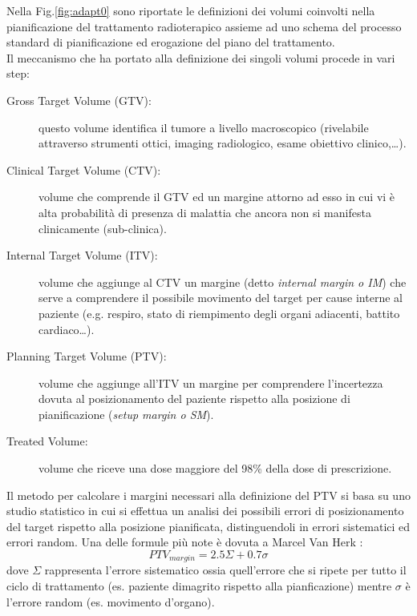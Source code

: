Nella Fig.\ref{fig:adapt0} sono riportate le definizioni dei volumi coinvolti nella pianificazione del trattamento radioterapico assieme ad uno schema del processo standard di pianificazione ed erogazione del piano del trattamento.\\
Il meccanismo che ha portato alla definizione dei singoli volumi procede in vari step:
\begin{description}
\item[Gross Target Volume (GTV):] questo volume identifica il tumore a livello macroscopico (rivelabile attraverso strumenti ottici, imaging radiologico, esame obiettivo clinico,\ldots).

\item[Clinical Target Volume (CTV):] volume che comprende il GTV ed un margine attorno ad esso in cui vi è alta probabilità di presenza di malattia che ancora non si manifesta clinicamente (sub-clinica).

\item[Internal Target Volume (ITV):] volume che aggiunge al CTV un margine (detto \textit{internal margin o IM}) che serve a comprendere il possibile movimento del target per cause interne al paziente (e.g. respiro, stato di riempimento degli organi adiacenti, battito cardiaco\ldots).

\item[Planning Target Volume (PTV):] volume che aggiunge all'ITV un margine per comprendere l'incertezza dovuta al posizionamento del paziente rispetto alla posizione di pianificazione (\textit{setup margin o SM}).

\item[Treated Volume:] volume che riceve una dose maggiore del 98\% della dose di prescrizione.

\end{description}

Il metodo per calcolare i margini necessari alla definizione del PTV si basa su uno studio statistico in cui si effettua un analisi dei possibili errori di posizionamento del target rispetto alla posizione pianificata, distinguendoli in errori sistematici ed errori random. Una delle formule più note è dovuta a Marcel Van Herk \cite{ICRU62}:
\begin{equation}
PTV_{margin} = 2.5\Sigma + 0.7\sigma
\end{equation}
dove $\Sigma$ rappresenta l'errore sistematico ossia quell'errore che si ripete per tutto il ciclo di trattamento (es. paziente dimagrito rispetto alla pianficazione) mentre $\sigma$ è l'errore random (es. movimento d'organo).

